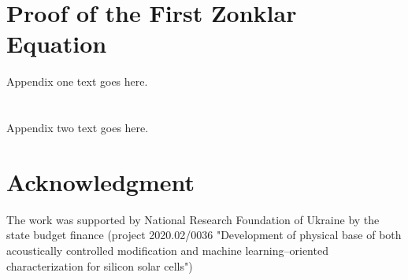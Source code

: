 \documentclass[journal]{IEEEtran}
\begin{document}
%


\appendices
\section{Proof of the First Zonklar Equation}
Appendix one text goes here.

\section{}
Appendix two text goes here.


\section*{Acknowledgment}


The work was supported by National Research Foundation  of Ukraine by the state budget finance
(project 2020.02/0036 "Development of physical base of both acoustically controlled modification and machine learning--oriented characterization for silicon solar cells")

\ifCLASSOPTIONcaptionsoff
  \newpage
\fi




\end{document}
